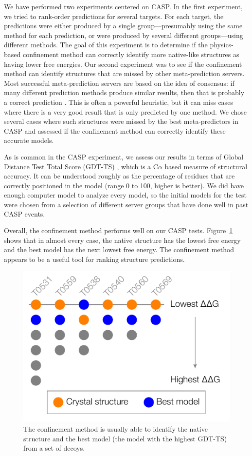 \documentclass[12pt]{article}
\begin{document}
We have performed two experiments centered on CASP. In the first experiment, we tried to rank-order predictions for
several targets. For each target, the predictions were either produced by a single group---presumably using the same
method for each prediction, or were produced by several different groups---using different methods. The goal of this
experiment is to determine if the physics-based confinement method can correctly identify more native-like structures as
having lower free energies. Our second experiment was to see if the confinement method can identify structures that are
missed by other meta-prediction servers. Most successful meta-prediction servers are based on the idea of consensus: if
many different prediction methods produce similar results, then that is probably a correct prediction \cite{Kryshtafovych2011,Wang2011}. This is
often a powerful heuristic, but it can miss cases where there is a very good result that is only predicted by one
method. We chose several cases where such structures were missed by the best meta-predictors in CASP and assessed if the
confinement method can correctly identify these accurate models.

As is common in the CASP experiment, we assess our results in terms of Global Distance Test Total Score (GDT-TS)
\cite{Zemla2003}, which is a C$\alpha$ based measure of structural accuracy. It can be understood roughly as the
percentage of residues that are correctly positioned in the model (range 0 to 100, higher is better). We did have enough
computer model to analyze every model, so the initial models for the test were chosen from a selection of different
server groups that have done well in past CASP events.

Overall, the confinement method performs well on our CASP tests. Figure~\ref{fig:summary_casp} shows that in almost
every case, the native structure has the lowest free energy and the best model has the next lowest free energy. The
confinement method appears to be a useful tool for ranking structure predictions.

\begin{figure}
\begin{center}
\includegraphics[width=3.5 in]{casp.pdf}
\end{center}
\caption{The confinement method is usually able to identify the native structure and the best model (the model with the
    highest GDT-TS) from a set of decoys.}
\label{fig:summary_casp}
\end{figure}
\end{document}
